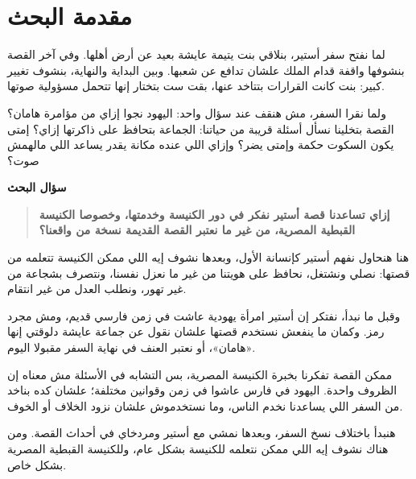 \documentclass[12pt,a4paper]{article}
\begin{document}
\section*{مقدمة البحث}
لما نفتح سفر أستير، بنلاقي بنت يتيمة عايشة بعيد عن أرض أهلها. وفي آخر القصة بنشوفها واقفة قدام الملك علشان تدافع عن شعبها. وبين البداية والنهاية، بنشوف تغيير كبير: بنت كانت القرارات بتتاخد عنها، بقت ست بتختار إنها تتحمل مسؤولية صوتها.\par\medskip
ولما نقرا السفر، مش هنقف عند سؤال واحد: اليهود نجوا إزاي من مؤامرة هامان؟ القصة بتخلينا نسأل أسئلة قريبة من حياتنا: الجماعة بتحافظ على ذاكرتها إزاي؟ إمتى يكون السكوت حكمة وإمتى يضر؟ وإزاي اللي عنده مكانة يقدر يساعد اللي مالهمش صوت؟\par\medskip
\vspace{0.2em}\noindent\textcolor{ochre}{\textbf{سؤال البحث}}\par\smallskip
\begin{quote}\colorbox{soft}{\parbox{0.94\linewidth}{\textbf{إزاي تساعدنا قصة أستير نفكر في دور الكنيسة وخدمتها، وخصوصا الكنيسة القبطية المصرية، من غير ما نعتبر القصة القديمة نسخة من واقعنا؟}}}\end{quote}
هنا هنحاول نفهم أستير كإنسانة الأول، وبعدها نشوف إيه اللي ممكن الكنيسة تتعلمه من قصتها: نصلي ونشتغل، نحافظ على هويتنا من غير ما نعزل نفسنا، ونتصرف بشجاعة من غير تهور، ونطلب العدل من غير انتقام.\par\medskip
وقبل ما نبدأ، نفتكر إن أستير امرأة يهودية عاشت في زمن فارسي قديم، ومش مجرد رمز. وكمان ما ينفعش نستخدم قصتها علشان نقول عن جماعة عايشة دلوقتي إنها «هامان»، أو نعتبر العنف في نهاية السفر مقبولا اليوم.\par\medskip
ممكن القصة تفكرنا بخبرة الكنيسة المصرية، بس التشابه في الأسئلة مش معناه إن الظروف واحدة. اليهود في فارس عاشوا في زمن وقوانين مختلفة؛ علشان كده بناخد من السفر اللي يساعدنا نخدم الناس، وما نستخدموش علشان نزود الخلاف أو الخوف.\par\medskip
هنبدأ باختلاف نسخ السفر، وبعدها نمشي مع أستير ومردخاي في أحداث القصة. ومن هناك نشوف إيه اللي ممكن نتعلمه للكنيسة بشكل عام، وللكنيسة القبطية المصرية بشكل خاص.\par\medskip
\clearpage
\clearpage
\end{document}
